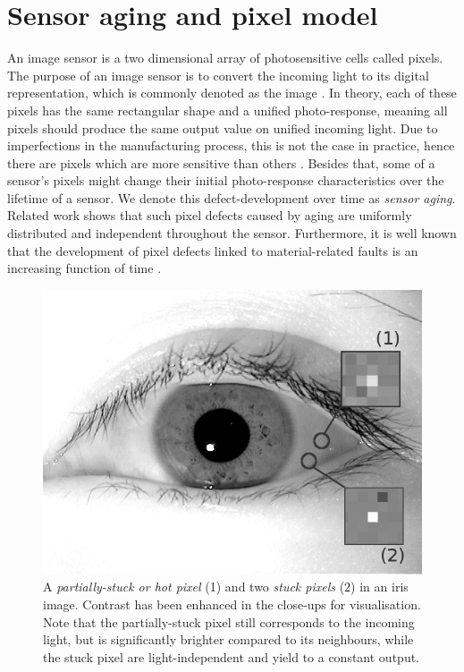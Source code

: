 \documentclass[10pt,twocolumn,letterpaper]{article}
\begin{document}
\section{Sensor aging and pixel model}
\label{sec:agingAndPixelModel}
An image sensor is a two dimensional array of photosensitive cells called pixels. The purpose of an image sensor is to convert the incoming light to its digital representation, which is commonly denoted as the image \cite{imageSensors}. In theory, each of these pixels has the same rectangular shape and a unified photo-response, meaning all pixels should produce the same output value on unified incoming light. Due to imperfections in the manufacturing process, this is not the case in practice, hence there are pixels which are more sensitive than others \cite{camAndDisplays}. Besides that, some of a sensor's pixels might change their initial photo-response characteristics over the lifetime of a sensor. We denote this defect-development over time as \emph{sensor aging}.
Related work shows that such pixel defects caused by aging are uniformly distributed and independent throughout the sensor. Furthermore, it is well known that the development of pixel defects linked to material-related faults is an increasing function of time \cite{datingImages, inFieldDefects, defectDetection,failureSemi, defectIdentification, fridrich}.

\begin{figure}
\centering
\includegraphics[width=0.7\linewidth]{img/defects.png}
\caption{A \emph{partially-stuck or hot pixel} (1) and two \emph{stuck pixels} (2) in an iris image. Contrast has been enhanced in the close-ups for visualisation. Note that the partially-stuck pixel still corresponds to the incoming light, but is significantly brighter compared to its neighbours, while the stuck pixel are light-independent and yield to a constant output.  }
\label{fig:hotStuck}
\end{figure}
\end{document}
